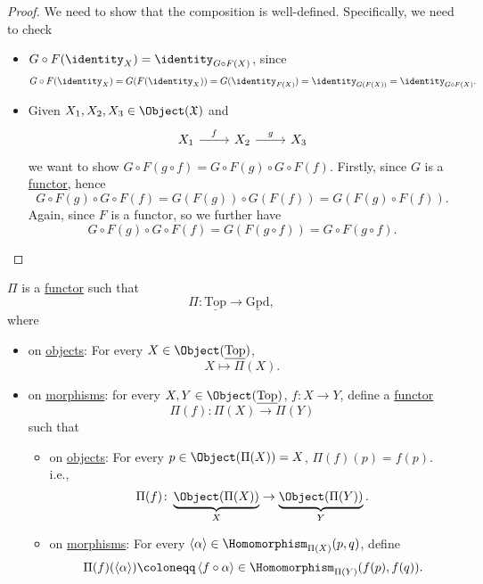 \begin{proof}
	We need to show that the composition is well-defined. Specifically, we need to check
	\begin{itemize}
		\item \(G\circ F(\identity_{X}) = \identity_{G\circ F(X)}\), since
		      \[
			      G\circ F(\identity_{X} ) = G(F(\identity_{X} )) = G(\identity_{F(X)}) = \identity_{G(F(X))} = \identity_{G\circ F(X)}.
		      \]
		\item Given \(X_1, X_2, X_3\in \Object (\mathfrak{X})\) and
		      \[
			      \begin{tikzcd}
				      {X_1} & {X_2} & {X_3}
				      \arrow["f", from=1-1, to=1-2]
				      \arrow["g", from=1-2, to=1-3]
			      \end{tikzcd}
		      \]
		      we want to show \(G\circ F(g\circ f) = G\circ F(g) \circ G\circ F(f)\). Firstly, since \(G\) is a \hyperref[def:functor]{functor}, hence
		      \[
			      G\circ F(g) \circ G\circ F(f) = G(F(g))	\circ G(F(f)) = G\left(F(g)\circ F(f)\right).
		      \]
		      Again, since \(F\) is a functor, so we further have
		      \[
			      G\circ F(g) \circ G\circ F(f) = G(F(g\circ f)) = G\circ F(g\circ f).
		      \]
	\end{itemize}
\end{proof}
\begin{theorem}\label{thm:fundamental-groupoid-defines-a-functor}
	\(\Pi\) is a \hyperref[def:functor]{functor} such that
	\[
		\Pi\colon \underline{\mathrm{Top}} \to \underline{\mathrm{Gpd}},
	\]
	where
	\begin{itemize}
		\item on \hyperref[def:object]{objects}: For every \(X\in \Object (\underline{\mathrm{Top}})\),
		      \[
			      X\mapsto \Pi (X).
		      \]
		\item on \hyperref[def:morphism]{morphisms}: for every \(X, Y\in \Object (\underline{\mathrm{Top}})\), \(f\colon X\to Y\), define a \hyperref[def:functor]{functor}
		      \[
			      \Pi (f)\colon \Pi(X)\to \Pi (Y)
		      \]
		      such that
		      \begin{itemize}
			      \item on \hyperref[def:object]{objects}: For every \(p\in \Object (\Pi (X)) = X\), \(\Pi (f)(p) = f(p)\). i.e.,
			            \[
				            \Pi (f)\colon \underbrace{\Object (\Pi (X))}_{X}\to \underbrace{\Object (\Pi (Y))}_{Y}.
			            \]
			      \item on \hyperref[def:morphism]{morphisms}: For every \(\left< \alpha  \right> \in \Homomorphism _{\Pi (X)}(p, q)\), define
			            \[
				            \Pi (f)(\left< \alpha  \right> )\coloneqq \left< f\circ \alpha  \right> \in \Homomorphism _{\Pi (Y)}(f(p), f(q)).
			            \]
		      \end{itemize}
	\end{itemize}
\end{theorem}

